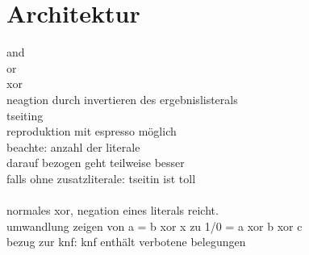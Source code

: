 \section{Architektur}


and\\
or\\
xor\\
neagtion durch invertieren des ergebnislisterals
~\\
tseiting\\
reproduktion mit espresso möglich
~\\
beachte: anzahl der literale\\
darauf bezogen geht teilweise besser\\
falls ohne zusatzliterale: tseitin ist toll\\
~\\
normales xor, negation eines literals reicht.\\
umwandlung zeigen von a = b xor x zu 1/0 = a xor b xor c\\
bezug zur knf: knf enthält verbotene belegungen